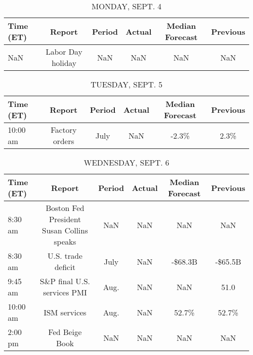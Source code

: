 \documentclass{article}%
\begin{document}
%
\normalsize%


\begin{table}[htbp]%
\caption{MONDAY, SEPT. 4}%
\centering%
\begin{adjustbox}{width=1\textwidth}%
\begin{tabular}{lccccc}
\toprule
Time (ET) &            Report & Period & Actual & Median Forecast & Previous \\
\midrule
      NaN & Labor Day holiday &    NaN &    NaN &             NaN &      NaN \\
\bottomrule
\end{tabular}
%
\end{adjustbox}%
\end{table}

%


\begin{table}[htbp]%
\caption{TUESDAY, SEPT. 5}%
\centering%
\begin{adjustbox}{width=1\textwidth}%
\begin{tabular}{lccccc}
\toprule
Time (ET) &         Report & Period & Actual & Median Forecast & Previous \\
\midrule
 10:00 am & Factory orders &   July &    NaN &           -2.3\% &     2.3\% \\
\bottomrule
\end{tabular}
%
\end{adjustbox}%
\end{table}

%


\begin{table}[htbp]%
\caption{WEDNESDAY, SEPT. 6}%
\centering%
\begin{adjustbox}{width=1\textwidth}%
\begin{tabular}{lccccc}
\toprule
Time (ET) &                                    Report & Period & Actual & Median Forecast & Previous \\
\midrule
  8:30 am & Boston Fed President Susan Collins speaks &    NaN &    NaN &             NaN &      NaN \\
  8:30 am &                        U.S. trade deficit &   July &    NaN &         -\$68.3B &  -\$65.5B \\
  9:45 am &               S\&P final U.S. services PMI &   Aug. &    NaN &             NaN &     51.0 \\
 10:00 am &                              ISM services &   Aug. &    NaN &           52.7\% &    52.7\% \\
  2:00 pm &                            Fed Beige Book &    NaN &    NaN &             NaN &      NaN \\
\bottomrule
\end{tabular}
%
\end{adjustbox}%
\end{table}
\end{document}

